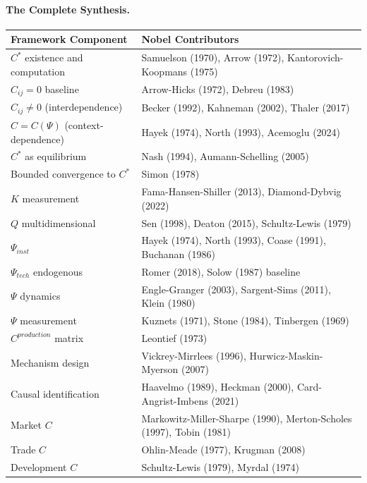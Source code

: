 \paragraph{The Complete Synthesis.}
\begin{center}
\renewcommand{\arraystretch}{1.3}
\small
\begin{tabular}{ll}
\hline
\textbf{Framework Component} & \textbf{Nobel Contributors} \\
\hline
$C^*$ existence and computation & Samuelson (1970), Arrow (1972), Kantorovich-Koopmans (1975) \\
$C_{ij} = 0$ baseline & Arrow-Hicks (1972), Debreu (1983) \\
$C_{ij} \neq 0$ (interdependence) & Becker (1992), Kahneman (2002), Thaler (2017) \\
$C = C(\Psi)$ (context-dependence) & Hayek (1974), North (1993), Acemoglu (2024) \\
$C^*$ as equilibrium & Nash (1994), Aumann-Schelling (2005) \\
Bounded convergence to $C^*$ & Simon (1978) \\
$K$ measurement & Fama-Hansen-Shiller (2013), Diamond-Dybvig (2022) \\
$Q$ multidimensional & Sen (1998), Deaton (2015), Schultz-Lewis (1979) \\
$\Psi_{inst}$ & Hayek (1974), North (1993), Coase (1991), Buchanan (1986) \\
$\Psi_{tech}$ endogenous & Romer (2018), Solow (1987) baseline \\
$\Psi$ dynamics & Engle-Granger (2003), Sargent-Sims (2011), Klein (1980) \\
$\Psi$ measurement & Kuznets (1971), Stone (1984), Tinbergen (1969) \\
$C^{production}$ matrix & Leontief (1973) \\
Mechanism design & Vickrey-Mirrlees (1996), Hurwicz-Maskin-Myerson (2007) \\
Causal identification & Haavelmo (1989), Heckman (2000), Card-Angrist-Imbens (2021) \\
Market $C$ & Markowitz-Miller-Sharpe (1990), Merton-Scholes (1997), Tobin (1981) \\
Trade $C$ & Ohlin-Meade (1977), Krugman (2008) \\
Development $C$ & Schultz-Lewis (1979), Myrdal (1974) \\
\hline
\end{tabular}
\end{center}

